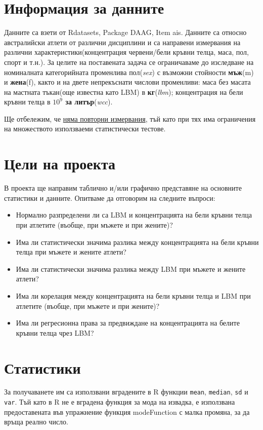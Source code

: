\documentclass[12pt]{article}
\newcommand{\code}{\texttt}
\begin{document}
\begin{large}
\tableofcontents{}


\section{Информация за данните}
Данните са взети от Rdatasets,  Package DAAG, Item ais. Данните са относно австралийски атлети от различни дисциплини и са направени измервания на различни характеристики(концентрация червени/бели кръвни телца, маса, пол, спорт и т.н.). За целите на поставената задача се ограничаваме до изследване на номиналната категорийната променлива пол(\textit{sex}) с възможни стойности \textbf{мъж}(m) и \textbf{жена}(f), както и на двете непрекъснати числови променливи: маса без масата на мастната тъкан(още известна като LBM) в \textbf{кг}(\textit{lbm}); концентрация на бели кръвни телца в \textbf{$10^9$ за литър}(\textit{wcc}). \par
Ще отбележим, че \uline{няма повторни измервания}, тъй като при тях има ограничения на множеството използваеми статистически тестове.

\section{Цели на проекта}

В проекта ще направим таблично и/или графично представяне на основните статистики и данните. Опитваме да отговорим на следните въпроси:

\begin{itemize}
\item Нормално разпределени ли са LBM и концентрацията на бели кръвни телца при атлетите (въобще, при мъжете и при жените)?
\item Има ли статистически значима разлика между концентрацията на бели кръвни телца при мъжете и жените атлети?
\item Има ли статистически значима разлика между LBM при мъжете и жените атлети?
\item Има ли корелация между концентрацията на бели кръвни телца и LBM при атлетите (въобще, при мъжете и при жените)?
\item Има ли регресионна права за предвиждане на концентрацията на белите кръвни телца чрез LBM?
\end{itemize}

\section{Статистики}
За получаванете им са използвани вградените в R функции \code{mean}, \code{median}, \code{sd} и \code{var}. Тъй като в R не е вградена функция за мода на извадка, е използвана предоставената във упражнение функция modeFunction с малка промяна, за да връща реално число.


\end{large}
\end{document}
